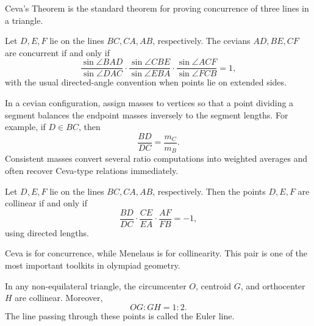     \begin{remark}
        Ceva's Theorem is the standard theorem for proving concurrence of three
        lines in a triangle.
    \end{remark}

    \begin{theorem}
        Let $D,E,F$ lie on the lines $BC,CA,AB$, respectively. The cevians
        $AD,BE,CF$ are concurrent if and only if
        \[
            \frac{\sin\angle BAD}{\sin\angle DAC}
            \cdot
            \frac{\sin\angle CBE}{\sin\angle EBA}
            \cdot
            \frac{\sin\angle ACF}{\sin\angle FCB}
            =1,
        \]
        with the usual directed-angle convention when points lie on extended
        sides.
    \end{theorem}

    \begin{strategy}
        In a cevian configuration, assign masses to vertices so that a point
        dividing a segment balances the endpoint masses inversely to the segment
        lengths. For example, if $D\in BC$, then
        \[
            \frac{BD}{DC}=\frac{m_C}{m_B}.
        \]
        Consistent masses convert several ratio computations into weighted
        averages and often recover Ceva-type relations immediately.
    \end{strategy}

    \begin{theorem}
        Let $D,E,F$ lie on the lines $BC,CA,AB$, respectively. Then the points
        $D,E,F$ are collinear if and only if
        \[
            \frac{BD}{DC}
            \cdot
            \frac{CE}{EA}
            \cdot
            \frac{AF}{FB}
            =
            -1,
        \]
        using directed lengths.
    \end{theorem}

    \begin{remark}
        Ceva is for concurrence, while Menelaus is for collinearity. This pair
        is one of the most important toolkits in olympiad geometry.
    \end{remark}

    \begin{theorem}
        In any non-equilateral triangle, the circumcenter $O$, centroid $G$,
        and orthocenter $H$ are collinear. Moreover,
        \[
            OG:GH=1:2.
        \]
        The line passing through these points is called the Euler line.
    \end{theorem}

